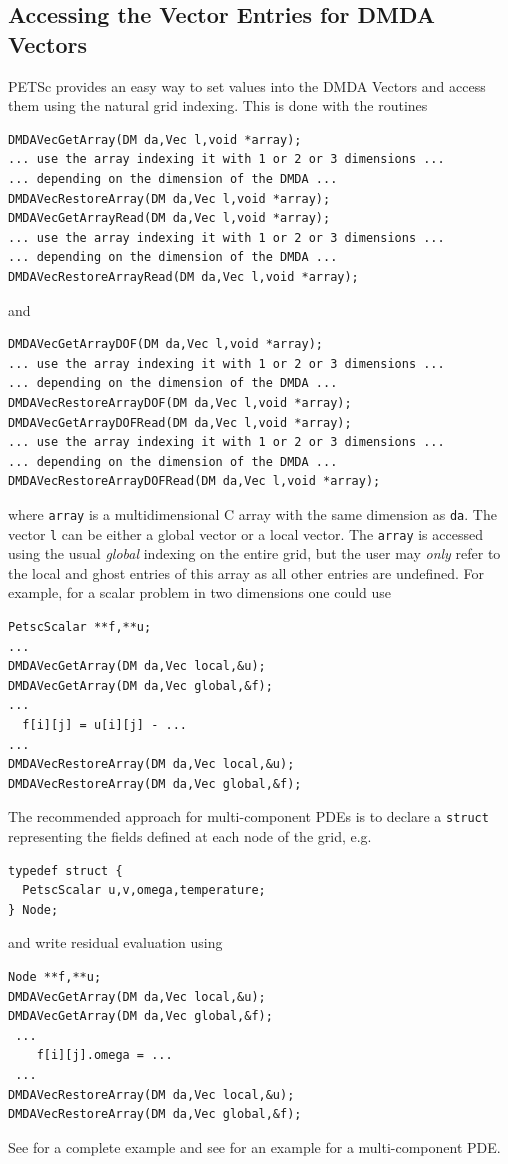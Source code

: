 \subsection{Accessing the Vector Entries for DMDA Vectors}
PETSc provides an easy way to set values into the DMDA Vectors and access them using
the natural grid indexing. This is done with the routines
\begin{lstlisting}
DMDAVecGetArray(DM da,Vec l,void *array);
... use the array indexing it with 1 or 2 or 3 dimensions ...
... depending on the dimension of the DMDA ...
DMDAVecRestoreArray(DM da,Vec l,void *array);
DMDAVecGetArrayRead(DM da,Vec l,void *array);
... use the array indexing it with 1 or 2 or 3 dimensions ...
... depending on the dimension of the DMDA ...
DMDAVecRestoreArrayRead(DM da,Vec l,void *array);
\end{lstlisting}
and
\begin{lstlisting}
DMDAVecGetArrayDOF(DM da,Vec l,void *array);
... use the array indexing it with 1 or 2 or 3 dimensions ...
... depending on the dimension of the DMDA ...
DMDAVecRestoreArrayDOF(DM da,Vec l,void *array);
DMDAVecGetArrayDOFRead(DM da,Vec l,void *array);
... use the array indexing it with 1 or 2 or 3 dimensions ...
... depending on the dimension of the DMDA ...
DMDAVecRestoreArrayDOFRead(DM da,Vec l,void *array);
\end{lstlisting}
where \lstinline{array} is a multidimensional C array with the same dimension as
\lstinline{da}. The vector \lstinline{l} can be either a global vector or a local vector.
The \lstinline{array} is accessed using the usual {\em global} indexing
on the entire grid, but the user may {\em only} refer to the local and ghost
entries of this array as all other entries are undefined. For example, for a
scalar problem in two dimensions one could use
\begin{lstlisting}
PetscScalar **f,**u;
...
DMDAVecGetArray(DM da,Vec local,&u);
DMDAVecGetArray(DM da,Vec global,&f);
...
  f[i][j] = u[i][j] - ...
...
DMDAVecRestoreArray(DM da,Vec local,&u);
DMDAVecRestoreArray(DM da,Vec global,&f);
\end{lstlisting}
The recommended approach for multi-component PDEs is to declare a \lstinline{struct} representing the fields defined at each node of the grid, e.g.
\begin{lstlisting}
typedef struct { 
  PetscScalar u,v,omega,temperature; 
} Node;
\end{lstlisting}
and write residual evaluation using
\begin{lstlisting}
Node **f,**u;
DMDAVecGetArray(DM da,Vec local,&u);
DMDAVecGetArray(DM da,Vec global,&f);
 ...
    f[i][j].omega = ...
 ...
DMDAVecRestoreArray(DM da,Vec local,&u);
DMDAVecRestoreArray(DM da,Vec global,&f);
\end{lstlisting}
See \href{http://www.mcs.anl.gov/petsc/petsc-current/src/snes/examples/tutorials/ex5.c.html}{} for a 
complete example and see \href{http://www.mcs.anl.gov/petsc/petsc-current/src/snes/examples/tutorials/ex19.c.html}{} for an
example for a multi-component PDE.

